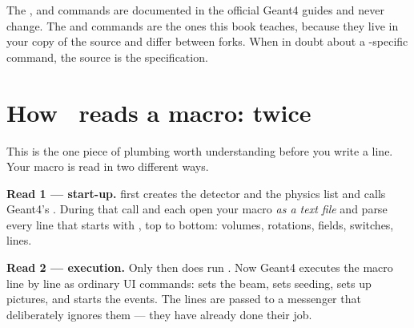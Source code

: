 \begin{keypoint}
The ,  and  commands are documented in the official Geant4 guides and never change. The  and  commands are the ones this book teaches, because they live in your copy of the source and differ between forks. When in doubt about a \musrSim-specific command, the source is the specification.
\end{keypoint}

\section{How \musrSim\ reads a macro: twice}
\label{sec:tworeads}
This is the one piece of plumbing worth understanding before you write a line. Your macro is read in two different ways.

\begin{center}
\end{center}

\textbf{Read 1 --- start-up.}  first creates the detector and the physics list and calls Geant4's . During that call  and  each open your macro \emph{as a text file} and parse every line that starts with , top to bottom: volumes, rotations, fields,  switches,  lines.

\textbf{Read 2 --- execution.} Only then does  run . Now Geant4 executes the macro line by line as ordinary UI commands:  sets the beam,  sets seeding,  sets up pictures, and  starts the events. The  lines are passed to a messenger that deliberately ignores them --- they have already done their job.

